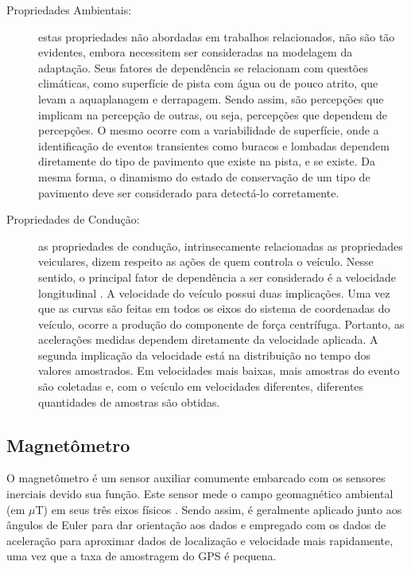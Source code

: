 \begin{description}
	\item [Propriedades Ambientais:] estas propriedades não abordadas em trabalhos relacionados, não são tão evidentes, embora necessitem ser consideradas na modelagem da adaptação. Seus fatores de dependência se relacionam com questões climáticas, como superfície de pista com água ou de pouco atrito, que levam a aquaplanagem e derrapagem. Sendo assim, são percepções que implicam na percepção de outras, ou seja, percepções que dependem de percepções. O mesmo ocorre com a variabilidade de superfície, onde a identificação de eventos transientes como buracos e lombadas dependem diretamente do tipo de pavimento que existe na pista, e se existe. Da mesma forma, o dinamismo do estado de conservação de um tipo de pavimento deve ser considerado para detectá-lo corretamente.

	\item [Propriedades de Condução:] as propriedades de condução, intrinsecamente relacionadas as propriedades veiculares, dizem respeito as ações de quem controla o veículo. Nesse sentido, o principal fator de dependência a ser considerado é a velocidade longitudinal \cite{Brunauer2016, Douangphachanh2013, Gueta2017, Kumar2017, Lima2016, M.2017, Nalavde2015, Singh2017}. A velocidade do veículo possui duas implicações. Uma vez que as curvas são feitas em todos os eixos do sistema de coordenadas do veículo, ocorre a produção do componente de força centrífuga. Portanto, as acelerações medidas dependem diretamente da velocidade aplicada. A segunda implicação da velocidade está na distribuição no tempo dos valores amostrados. Em velocidades mais baixas, mais amostras do evento são coletadas e, com o veículo em velocidades diferentes, diferentes quantidades de amostras são obtidas.

\end{description}

\subsection{Magnetômetro}

O magnetômetro é um sensor auxiliar comumente embarcado com os sensores inerciais devido sua função. Este sensor mede o campo geomagnético ambiental (em $\mu$T) em seus três eixos físicos \cite{Sattar2018}. Sendo assim, é geralmente aplicado junto aos ângulos de Euler para dar orientação aos dados e empregado com os dados de aceleração para aproximar dados de localização e velocidade mais rapidamente, uma vez que a taxa de amostragem do GPS é pequena.

